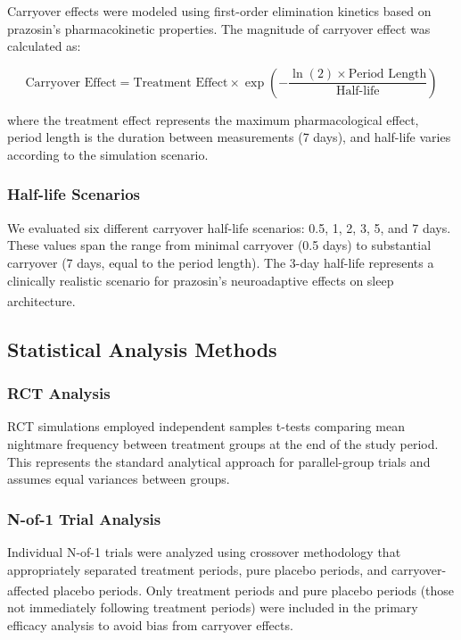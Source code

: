 \documentclass[
  11pt,
]{article}
\begin{document}
Carryover effects were modeled using first-order elimination kinetics
based on prazosin's pharmacokinetic properties. The magnitude of
carryover effect was calculated as:

\[\text{Carryover Effect} = \text{Treatment Effect} \times \exp\left(-\frac{\ln(2) \times \text{Period Length}}{\text{Half-life}}\right)\]

where the treatment effect represents the maximum pharmacological
effect, period length is the duration between measurements (7 days), and
half-life varies according to the simulation scenario.

\subsubsection{Half-life Scenarios}\label{half-life-scenarios}

We evaluated six different carryover half-life scenarios: 0.5, 1, 2, 3,
5, and 7 days. These values span the range from minimal carryover (0.5
days) to substantial carryover (7 days, equal to the period length). The
3-day half-life represents a clinically realistic scenario for
prazosin's neuroadaptive effects on sleep
architecture\textsuperscript{}.

\subsection{Statistical Analysis
Methods}\label{statistical-analysis-methods}

\subsubsection{RCT Analysis}\label{rct-analysis}

RCT simulations employed independent samples t-tests comparing mean
nightmare frequency between treatment groups at the end of the study
period. This represents the standard analytical approach for
parallel-group trials and assumes equal variances between groups.

\subsubsection{N-of-1 Trial Analysis}\label{n-of-1-trial-analysis}

Individual N-of-1 trials were analyzed using crossover methodology that
appropriately separated treatment periods, pure placebo periods, and
carryover-affected placebo
periods\textsuperscript{}.
Only treatment periods and pure placebo periods (those not immediately
following treatment periods) were included in the primary efficacy
analysis to avoid bias from carryover effects.
\end{document}
